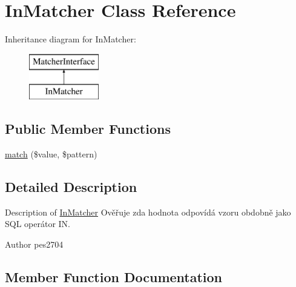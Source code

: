 \hypertarget{class_pes_1_1_query_1_1_matcher_1_1_in_matcher}{}\section{In\+Matcher Class Reference}
\label{class_pes_1_1_query_1_1_matcher_1_1_in_matcher}
Inheritance diagram for In\+Matcher\+:\begin{figure}[H]
\begin{center}
\leavevmode
\includegraphics[height=2.000000cm]{class_pes_1_1_query_1_1_matcher_1_1_in_matcher}
\end{center}
\end{figure}
\subsection*{Public Member Functions}
\begin{DoxyCompactItemize}
\item 
\mbox{\hyperlink{class_pes_1_1_query_1_1_matcher_1_1_in_matcher_af38750109828e091458dbb0481a2a0d7}{match}} (\$value, \$pattern)
\end{DoxyCompactItemize}


\subsection{Detailed Description}
Description of \mbox{\hyperlink{class_pes_1_1_query_1_1_matcher_1_1_in_matcher}{In\+Matcher}} Ověřuje zda hodnota odpovídá vzoru obdobně jako S\+QL operátor IN. \begin{DoxyAuthor}{Author}
pes2704 
\end{DoxyAuthor}


\subsection{Member Function Documentation}
\mbox{\label{class_pes_1_1_query_1_1_matcher_1_1_in_matcher_af38750109828e091458dbb0481a2a0d7}} 
